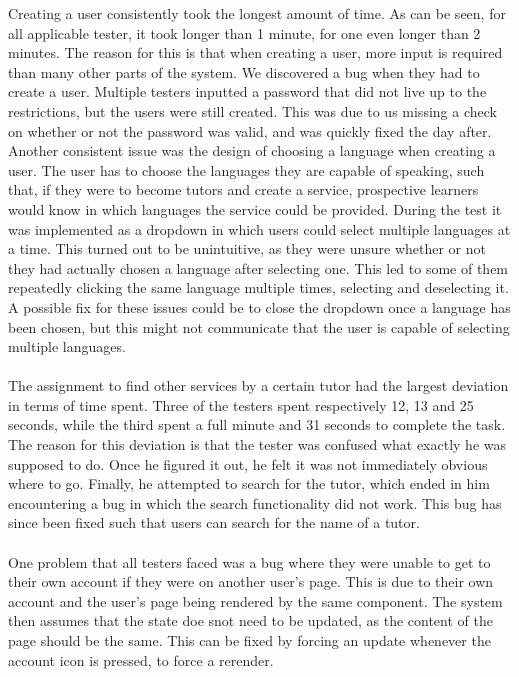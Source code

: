 Creating a user consistently took the longest amount of time.
As can be seen, for all applicable tester, it took longer than 1 minute, for one even longer than 2 minutes.
The reason for this is that when creating a user, more input is required than many other parts of the system.
We discovered a bug when they had to create a user. 
Multiple testers inputted a password that did not live up to the restrictions, but the users were still created. 
This was due to us missing a check on whether or not the password was valid, and was quickly fixed the day after.
Another consistent issue was the design of choosing a language when creating a user.
The user has to choose the languages they are capable of speaking, such that, if they were to become tutors and create a service, prospective learners would know in which languages the service could be provided.
During the test it was implemented as a dropdown in which users could select multiple languages at a time.
This turned out to be unintuitive, as they were unsure whether or not they had actually chosen a language after selecting one.
This led to some of them repeatedly clicking the same language multiple times, selecting and deselecting it.
A possible fix for these issues could be to close the dropdown once a language has been chosen, but this might not communicate that the user is capable of selecting multiple languages.
\\\\
The assignment to find other services by a certain tutor had the largest deviation in terms of time spent.
Three of the testers spent respectively 12, 13 and 25 seconds, while the third spent a full minute and 31 seconds to complete the task.
The reason for this deviation is that the tester was confused what exactly he was supposed to do.
Once he figured it out, he felt it was not immediately obvious where to go.
Finally, he attempted to search for the tutor, which ended in him encountering a bug in which the search functionality did not work.
This bug has since been fixed such that users can search for the name of a tutor.
\\\\
One problem that all testers faced was a bug where they were unable to get to their own account if they were on another user's page.
This is due to their own account and the user's page being rendered by the same component.
The system then assumes that the state doe snot need to be updated, as the content of the page should be the same.
This can be fixed by forcing an update whenever the account icon is pressed, to force a rerender.

